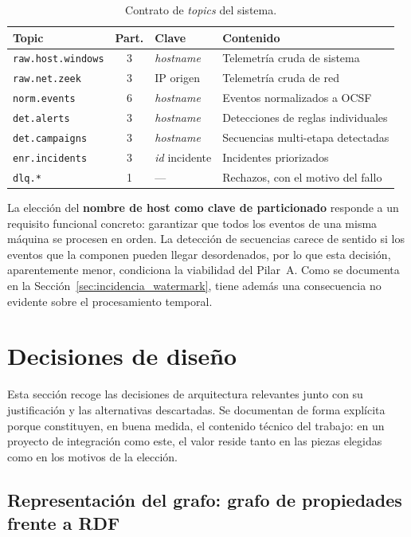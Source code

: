 \begin{table}[H]
\centering
\begin{tabular}{|l|c|l|l|}
\hline
\textbf{Topic} & \textbf{Part.} & \textbf{Clave} & \textbf{Contenido} \\
\hline
\texttt{raw.host.windows} & 3 & \textit{hostname} & Telemetría cruda de sistema \\
\texttt{raw.net.zeek} & 3 & IP origen & Telemetría cruda de red \\
\texttt{norm.events} & 6 & \textit{hostname} & Eventos normalizados a OCSF \\
\texttt{det.alerts} & 3 & \textit{hostname} & Detecciones de reglas individuales \\
\texttt{det.campaigns} & 3 & \textit{hostname} & Secuencias multi-etapa detectadas \\
\texttt{enr.incidents} & 3 & \textit{id} incidente & Incidentes priorizados \\
\texttt{dlq.*} & 1 & --- & Rechazos, con el motivo del fallo \\
\hline
\end{tabular}
\caption{Contrato de \textit{topics} del sistema.}
\label{tab:topics}
\end{table}

La elección del \textbf{nombre de host como clave de particionado} responde a un requisito
funcional concreto: garantizar que todos los eventos de una misma máquina se procesen en
orden. La detección de secuencias carece de sentido si los eventos que la componen pueden
llegar desordenados, por lo que esta decisión, aparentemente menor, condiciona la viabilidad
del Pilar~A. Como se documenta en la Sección~\ref{sec:incidencia_watermark}, tiene además una
consecuencia no evidente sobre el procesamiento temporal.

\section{Decisiones de diseño}

Esta sección recoge las decisiones de arquitectura relevantes junto con su justificación y
las alternativas descartadas. Se documentan de forma explícita porque constituyen, en buena
medida, el contenido técnico del trabajo: en un proyecto de integración como este, el valor
reside tanto en las piezas elegidas como en los motivos de la elección.

\subsection{Representación del grafo: grafo de propiedades frente a RDF}

